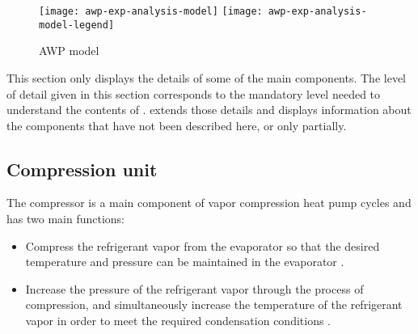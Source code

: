 \begin{figure}[htbp]
  \centering
  \texttt{[image: awp-exp-analysis-model]}
  \texttt{[image: awp-exp-analysis-model-legend]}
  \caption[AWP model]{AWP model}
  \label{fig:awp-exp-analysis-model}
\end{figure}


This section only displays the details of some of the \AWP{} main
components. The level of detail given in this section corresponds to
the mandatory level needed to understand the contents of
. 
extends those details and displays information about the components
that have not been described here, or only partially.

\subsection{Compression unit}
\label{sec:awp-cp-unit}

The compressor is a main component of vapor compression heat pump
cycles and has two main functions:

\begin{itemize}
\item Compress the refrigerant vapor from the evaporator so that the
  desired temperature and pressure can be maintained in the evaporator
  \citep[p.\,109]{dincer-kanoglu-2010a}.
\item Increase the pressure of the refrigerant vapor through the
  process of compression, and simultaneously increase the temperature
  of the refrigerant vapor \citep[p.\,109]{dincer-kanoglu-2010a} in
  order to meet the required condensation conditions \citep{rapin-desmons-2011a}.
\end{itemize}

